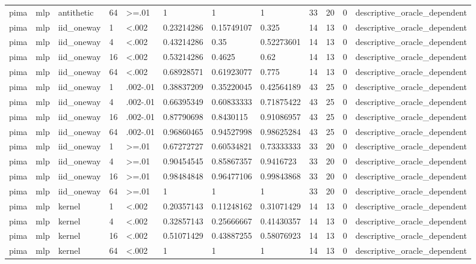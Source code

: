 \begin{tabular}{llllllllllll}
pima & mlp & antithetic & 64 & >=.01 & 1 & 1 & 1 & 33 & 20 & 0 & descriptive\_oracle\_dependent \\
pima & mlp & iid\_oneway & 1 & <.002 & 0.23214286 & 0.15749107 & 0.325 & 14 & 13 & 0 & descriptive\_oracle\_dependent \\
pima & mlp & iid\_oneway & 4 & <.002 & 0.43214286 & 0.35 & 0.52273601 & 14 & 13 & 0 & descriptive\_oracle\_dependent \\
pima & mlp & iid\_oneway & 16 & <.002 & 0.53214286 & 0.4625 & 0.62 & 14 & 13 & 0 & descriptive\_oracle\_dependent \\
pima & mlp & iid\_oneway & 64 & <.002 & 0.68928571 & 0.61923077 & 0.775 & 14 & 13 & 0 & descriptive\_oracle\_dependent \\
pima & mlp & iid\_oneway & 1 & .002-.01 & 0.38837209 & 0.35220045 & 0.42564189 & 43 & 25 & 0 & descriptive\_oracle\_dependent \\
pima & mlp & iid\_oneway & 4 & .002-.01 & 0.66395349 & 0.60833333 & 0.71875422 & 43 & 25 & 0 & descriptive\_oracle\_dependent \\
pima & mlp & iid\_oneway & 16 & .002-.01 & 0.87790698 & 0.8430115 & 0.91086957 & 43 & 25 & 0 & descriptive\_oracle\_dependent \\
pima & mlp & iid\_oneway & 64 & .002-.01 & 0.96860465 & 0.94527998 & 0.98625284 & 43 & 25 & 0 & descriptive\_oracle\_dependent \\
pima & mlp & iid\_oneway & 1 & >=.01 & 0.67272727 & 0.60534821 & 0.73333333 & 33 & 20 & 0 & descriptive\_oracle\_dependent \\
pima & mlp & iid\_oneway & 4 & >=.01 & 0.90454545 & 0.85867357 & 0.9416723 & 33 & 20 & 0 & descriptive\_oracle\_dependent \\
pima & mlp & iid\_oneway & 16 & >=.01 & 0.98484848 & 0.96477106 & 0.99843868 & 33 & 20 & 0 & descriptive\_oracle\_dependent \\
pima & mlp & iid\_oneway & 64 & >=.01 & 1 & 1 & 1 & 33 & 20 & 0 & descriptive\_oracle\_dependent \\
pima & mlp & kernel & 1 & <.002 & 0.20357143 & 0.11248162 & 0.31071429 & 14 & 13 & 0 & descriptive\_oracle\_dependent \\
pima & mlp & kernel & 4 & <.002 & 0.32857143 & 0.25666667 & 0.41430357 & 14 & 13 & 0 & descriptive\_oracle\_dependent \\
pima & mlp & kernel & 16 & <.002 & 0.51071429 & 0.43887255 & 0.58076923 & 14 & 13 & 0 & descriptive\_oracle\_dependent \\
pima & mlp & kernel & 64 & <.002 & 1 & 1 & 1 & 14 & 13 & 0 & descriptive\_oracle\_dependent \\

\end{tabular}
